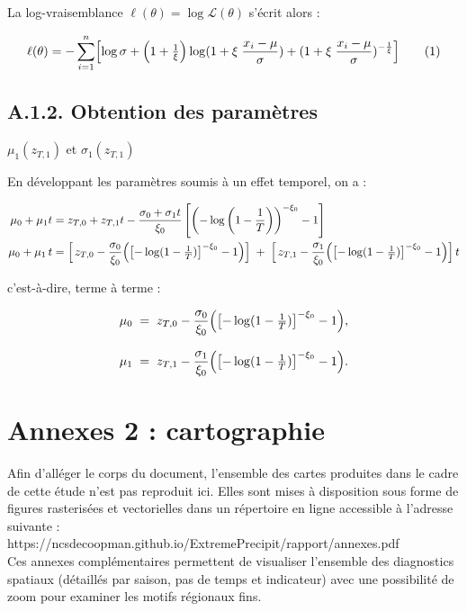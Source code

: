 \documentclass[
  article,
  nofooter,
  noheadings]{jss}
\begin{document}
La log-vraisemblance \(\ell(\theta) = \log \mathcal{L}(\theta)\) s'écrit
alors :

\[
\ell(\theta)=
-\sum_{i=1}^n\Bigl[
\log\sigma
+\Bigl(1+\tfrac1{\xi}\Bigr)\log (1+\xi\;\frac{x_i-\mu}{\sigma})
+(1+\xi\;\frac{x_i-\mu}{\sigma})^{-\frac{1}{\xi}}
\Bigr]
\tag{1}
\]

\subsection*{A.1.2. Obtention des
paramètres}\label{a.1.2.-obtention-des-paramuxe8tres}

\(\mu_1(z_{T,1})\) et \(\sigma_1(z_{T,1})\)

En développant les paramètres soumis à un effet temporel, on a :

\[
\begin{aligned}
\mu_0 + \mu_1 t &= z_{T,0} + z_{T,1} t - \dfrac{\sigma_0 + \sigma_1 t}{\xi_0} \left[ \left( -\log\left(1 - \frac{1}{T} \right) \right)^{-\xi_0} - 1 \right]\\
\mu_0+\mu_1\,t &= \Bigl[\,z_{T,0}
-\dfrac{\sigma_0}{\xi_0}\Bigl(\bigl[-\log(1-\tfrac1T)\bigr]^{-\xi_0}-1\Bigr)
\Bigr]\;+\;\Bigl[\,z_{T,1}-\dfrac{\sigma_1}{\xi_0}\Bigl(\bigl[-\log(1-\tfrac1T)\bigr]^{-\xi_0}-1\Bigr)\Bigr]\,t\\
\end{aligned}
\]

c'est-à-dire, terme à terme :

\[
\begin{aligned}
\mu_0 &\;=\; z_{T,0}
-\dfrac{\sigma_0}{\xi_0}\Bigl(\bigl[-\log(1-\tfrac1T)\bigr]^{-\xi_0}-1\Bigr),\\[0.8em]
\mu_1 &\;=\; z_{T,1}
-\dfrac{\sigma_1}{\xi_0}\Bigl(\bigl[-\log(1-\tfrac1T)\bigr]^{-\xi_0}-1\Bigr).
\end{aligned}
\]

\section*{Annexes 2 : cartographie}\label{annexes-2-cartographie}

Afin d'alléger le corps du document, l'ensemble des cartes produites
dans le cadre de cette étude n'est pas reproduit ici. Elles sont mises à
disposition sous forme de figures rasterisées et vectorielles dans un
répertoire en ligne accessible à l'adresse suivante :\\

https://ncsdecoopman.github.io/ExtremePrecipit/rapport/annexes.pdf\\

Ces annexes complémentaires permettent de visualiser l'ensemble des
diagnostics spatiaux (détaillés par saison, pas de temps et indicateur)
avec une possibilité de zoom pour examiner les motifs régionaux fins.
\end{document}
